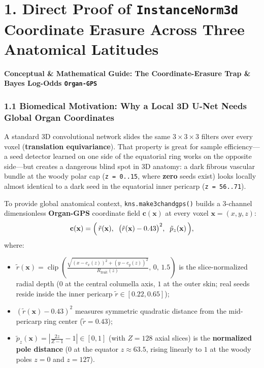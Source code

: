 \documentclass[10pt,a4paper]{article}
\renewcommand{\_}{\origunderscore\allowbreak}
\begin{document}
\section*{1. Direct Proof of \texttt{InstanceNorm3d} Coordinate Erasure Across Three Anatomical Latitudes}

\begin{guidehdr}
{\small\bfseries\color{kiwigreen!75!black}Conceptual \& Mathematical Guide: The Coordinate-Erasure Trap \& Bayes Log-Odds \texttt{Organ-GPS}}
\end{guidehdr}

\subsubsection*{1.1 Biomedical Motivation: Why a Local 3D U-Net Needs Global Organ Coordinates}
A standard 3D convolutional network slides the same $3 \times 3 \times 3$ filters over every voxel (\textbf{translation equivariance}). That property is great for sample efficiency---a seed detector learned on one side of the equatorial ring works on the opposite side---but creates a dangerous blind spot in 3D anatomy: a dark fibrous vascular bundle at the woody polar cap (\texttt{z = 0..15}, where \textbf{zero} seeds exist) looks locally almost identical to a dark seed in the equatorial inner pericarp (\texttt{z = 56..71}).

To provide global anatomical context, \texttt{kns.make\_3ch\_and\_gps()} builds a 3-channel dimensionless \textbf{Organ-GPS} coordinate field $\mathbf{c}(\mathbf{x})$ at every voxel $\mathbf{x} = (x, y, z)$:
\[
\mathbf{c}(\mathbf{x}) = \Bigl(\,\tilde{r}(\mathbf{x}),\;\; \bigl(\tilde{r}(\mathbf{x}) - 0.43\bigr)^2,\;\; \tilde{p}_z(\mathbf{x})\,\Bigr),
\]
where:
\begin{itemize}
\item $\tilde{r}(\mathbf{x}) = \operatorname{clip}\!\left(\frac{\sqrt{(x - c_x(z))^2 + (y - c_y(z))^2}}{R_{\text{fruit}}(z)},\, 0,\, 1.5\right)$ is the slice-normalized radial depth ($0$ at the central columella axis, $1$ at the outer skin; real seeds reside inside the inner pericarp $\tilde{r} \in [0.22, 0.65]$);
\item $(\tilde{r}(\mathbf{x}) - 0.43)^2$ measures symmetric quadratic distance from the mid-pericarp ring center ($\tilde{r} = 0.43$);
\item $\tilde{p}_z(\mathbf{x}) = \left|\frac{2z}{Z - 1} - 1\right| \in [0, 1]$ (with $Z = 128$ axial slices) is the \textbf{normalized pole distance} ($0$ at the equator $z \approx 63.5$, rising linearly to $1$ at the woody poles $z = 0$ and $z = 127$).
\end{itemize}
\end{document}
